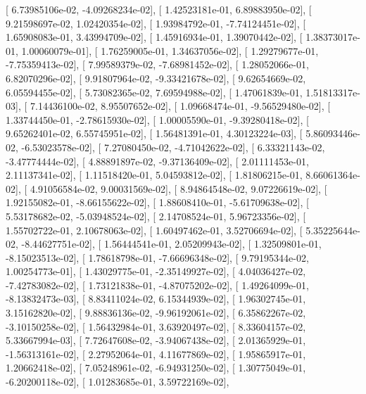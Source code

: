 \documentclass{article}
\begin{document}
       [  6.73985106e-02,  -4.09268234e-02],
       [  1.42523181e-01,   6.89883950e-02],
       [  9.21598697e-02,   1.02420354e-02],
       [  1.93984792e-01,  -7.74124451e-02],
       [  1.65908083e-01,   3.43994709e-02],
       [  1.45916934e-01,   1.39070442e-02],
       [  1.38373017e-01,   1.00060079e-01],
       [  1.76259005e-01,   1.34637056e-02],
       [  1.29279677e-01,  -7.75359413e-02],
       [  7.99589379e-02,  -7.68981452e-02],
       [  1.28052066e-01,   6.82070296e-02],
       [  9.91807964e-02,  -9.33421678e-02],
       [  9.62654669e-02,   6.05594455e-02],
       [  5.73082365e-02,   7.69594988e-02],
       [  1.47061839e-01,   1.51813317e-03],
       [  7.14436100e-02,   8.95507652e-02],
       [  1.09668474e-01,  -9.56529480e-02],
       [  1.33744450e-01,  -2.78615930e-02],
       [  1.00005590e-01,  -9.39280418e-02],
       [  9.65262401e-02,   6.55745951e-02],
       [  1.56481391e-01,   4.30123224e-03],
       [  5.86093446e-02,  -6.53023578e-02],
       [  7.27080450e-02,  -4.71042622e-02],
       [  6.33321143e-02,  -3.47774444e-02],
       [  4.88891897e-02,  -9.37136409e-02],
       [  2.01111453e-01,   2.11137341e-02],
       [  1.11518420e-01,   5.04593812e-02],
       [  1.81806215e-01,   8.66061364e-02],
       [  4.91056584e-02,   9.00031569e-02],
       [  8.94864548e-02,   9.07226619e-02],
       [  1.92155082e-01,  -8.66155622e-02],
       [  1.88608410e-01,  -5.61709638e-02],
       [  5.53178682e-02,  -5.03948524e-02],
       [  2.14708524e-01,   5.96723356e-02],
       [  1.55702722e-01,   2.10678063e-02],
       [  1.60497462e-01,   3.52706694e-02],
       [  5.35225644e-02,  -8.44627751e-02],
       [  1.56444541e-01,   2.05209943e-02],
       [  1.32509801e-01,  -8.15023513e-02],
       [  1.78618798e-01,  -7.66696348e-02],
       [  9.79195344e-02,   1.00254773e-01],
       [  1.43029775e-01,  -2.35149927e-02],
       [  4.04036427e-02,  -7.42783082e-02],
       [  1.73121838e-01,  -4.87075202e-02],
       [  1.49264099e-01,  -8.13832473e-03],
       [  8.83411024e-02,   6.15344939e-02],
       [  1.96302745e-01,   3.15162820e-02],
       [  9.88836136e-02,  -9.96192061e-02],
       [  6.35862267e-02,  -3.10150258e-02],
       [  1.56432984e-01,   3.63920497e-02],
       [  8.33604157e-02,   5.33667994e-03],
       [  7.72647608e-02,  -3.94067438e-02],
       [  2.01365929e-01,  -1.56313161e-02],
       [  2.27952064e-01,   4.11677869e-02],
       [  1.95865917e-01,   1.20662418e-02],
       [  7.05248961e-02,  -6.94931250e-02],
       [  1.30775049e-01,  -6.20200118e-02],
       [  1.01283685e-01,   3.59722169e-02],
\end{document}
